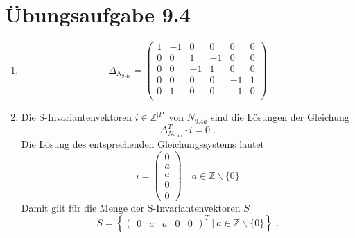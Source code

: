 \documentclass[a4paper]{scrartcl}
\begin{document}
\section*{Übungsaufgabe 9.4} 
\begin{enumerate}
    \item
        \begin{equation}
            \Delta_{N_{9.4a}} =
            \begin{pmatrix}
                 1 & -1 &  0 &  0 &  0 &  0 \\
                 0 &  0 &  1 & -1 &  0 &  0 \\
                 0 &  0 & -1 &  1 &  0 &  0 \\
                 0 &  0 &  0 &  0 & -1 &  1 \\
                 0 &  1 &  0 &  0 & -1 &  0 \\
            \end{pmatrix}
        \end{equation}
        

    \item
        Die S-Invariantenvektoren $i \in \mathbb{Z}^{|P|}$ von $N_{9.4a}$ sind
        die Lösungen der Gleichung
        \begin{equation}
            \Delta_{N_{9.4a}}^T \cdot i = 0 \text{ .}
        \end{equation}
        Die Lösung des entsprechenden Gleichungssystems lautet
        \begin{equation}
            i =
            \begin{pmatrix}
                0 \\ a \\ a \\ 0 \\ 0
            \end{pmatrix}
            \quad
            a \in \mathbb{Z} \backslash \{ 0 \}
        \end{equation}
        Damit gilt für die Menge der S-Invariantenvektoren $S$
        \begin{equation}
            S = \left\{ 
                \begin{pmatrix}
                    0 & a & a & 0 & 0
                \end{pmatrix}^T
                \ \vert \ 
                a \in \mathbb{Z} \backslash \{ 0 \}
            \right\}
            \text{ .}
        \end{equation}
        
        


\end{enumerate}
\end{document}

